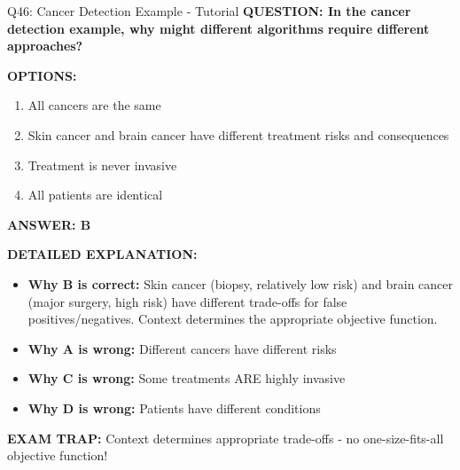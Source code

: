 \documentclass[8pt]{beamer}
\begin{document}
	\begin{frame}{Q46: Cancer Detection Example - Tutorial}
		\fontsize{6.5}{7.5}\selectfont
		\textbf{QUESTION: In the cancer detection example, why might different algorithms require different approaches?}
		
		\vspace{0.1cm}
		\textbf{OPTIONS:}
		\begin{enumerate}
			\item All cancers are the same
			\item Skin cancer and brain cancer have different treatment risks and consequences
			\item Treatment is never invasive
			\item All patients are identical
		\end{enumerate}
		
		\vspace{0.1cm}
		\textcolor{myblue}{\textbf{ANSWER: B}}
		
		\vspace{0.1cm}
		\textbf{DETAILED EXPLANATION:}
		\begin{itemize}
			\item \textbf{Why B is correct:} Skin cancer (biopsy, relatively low risk) and brain cancer (major surgery, high risk) have different trade-offs for false positives/negatives. Context determines the appropriate objective function.
			\item \textbf{Why A is wrong:} Different cancers have different risks
			\item \textbf{Why C is wrong:} Some treatments ARE highly invasive
			\item \textbf{Why D is wrong:} Patients have different conditions
		\end{itemize}
		
		\textcolor{myred}{\textbf{EXAM TRAP:}} Context determines \textcolor{myblue}{appropriate trade-offs} - no one-size-fits-all objective function!
	\end{frame}
	
\end{document}

